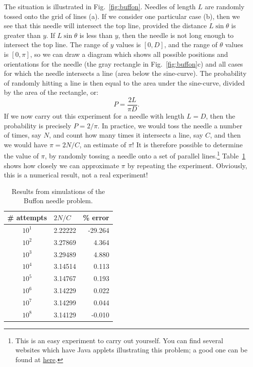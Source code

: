The situation is illustrated in Fig.~\ref{fig:buffon}.  Needles of length $L$ are randomly tossed onto the grid of lines (a).  If we consider one particular case (b), then we see that this needle will intersect the top line, provided the distance $L\sin\theta$ is greater than $y$.  If $L\sin\theta$ is less than $y$, then the needle is not long enough to intersect the top line.  The range of $y$ values is $[0,D]$, and the range of $\theta$ values is $[0,\pi]$, so we can draw a diagram which shows all possible positions and orientations for the needle (the gray rectangle in Fig.~\ref{fig:buffon}c) and all cases for which the needle intersects a line (area below the sine-curve).  The probability of randomly hitting a line is then equal to the area under the sine-curve, divided by the area of the rectangle, or:
\[
	P = \frac{2L}{\pi D}.
\]
If we now carry out this experiment for a needle with length $L=D$, then the probability is precisely $P=2/\pi$. In practice, we would toss the needle a number of times, say $N$, and count how many times it intersects a line, say $C$, and then we would have $\pi=2N/C$, an estimate of $\pi$!  It is therefore possible to determine the value of $\pi$, by randomly tossing a needle onto a set of parallel lines.\footnote{This is an easy experiment to carry out yourself.  You can find several websites which have Java applets illustrating this problem;  a good one can be found at \href{http://mste.illinois.edu/activity/buffon/}{here}.}  Table~\ref{tb:buffon} shows how closely we can approximate $\pi$ by repeating the experiment.  Obviously, this is a numerical result, not a real experiment!

\begin{table}[h]
\centering\leavevmode
\begin{tabular}{|c|l|r|}
\hline
\# attempts & $2N/C$ & \% error\\
\hline\hline
$10^{1}$ & 2.22222& -29.264\\
$10^{2}$ & 3.27869& 4.364\\
$10^{3}$ & 3.29489& 4.880\\
$10^{4}$ & 3.14514& 0.113\\
$10^{5}$ & 3.14767& 0.193\\
$10^{6}$ & 3.14229& 0.022\\
$10^{7}$ & 3.14299& 0.044\\
$10^{8}$ & 3.14129&-0.010\\
\hline
\end{tabular}
\caption{\label{tb:buffon}Results from simulations of the Buffon needle problem.}
\end{table}


